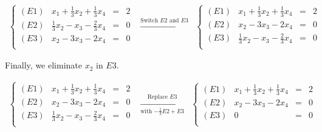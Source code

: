 \documentclass{ximera}
\begin{document}
\begin{example}
\begin{enumerate}
\[\begin{array}{ccc}

\left\{ 

\begin{array}{lrcr}

(E1) & x_1 + \frac{1}{3}x_2 + \frac{1}{3}x_4 & = & 2 \\   
(E2) &        \frac{1}{3} x_2 -x_3 -\frac{2}{3}x_4 & = & 0  \\  
(E3) &  x_2 -3x_3 -2x_4 & = & 0 \\

\end{array} 

\right.

&
\xrightarrow{\text{Switch $E2$ and $E3$}}

&
\left\{ 

\begin{array}{lrcr}

(E1) & x_1 + \frac{1}{3}x_2 + \frac{1}{3}x_4 & = & 2 \\   
(E2) &    x_2 -3x_3 -2x_4 & = & 0 \\  
(E3) &  \frac{1}{3} x_2 -x_3 -\frac{2}{3}x_4 & = & 0  \\

\end{array} 

\right.\end{array}\]

Finally, we eliminate $x_2$ in $E3$.

\[\begin{array}{ccc}
\left\{ 

\begin{array}{lrcr}

(E1) & x_1 + \frac{1}{3}x_2 + \frac{1}{3}x_4 & = & 2 \\   
(E2) &    x_2 -3x_3 -2x_4 & = & 0 \\  
(E3) &  \frac{1}{3} x_2 -x_3 -\frac{2}{3}x_4 & = & 0  \\

\end{array} 

\right.

&

\xrightarrow[\text{with $-\frac{1}{3}E2 + E3$}]{\text{Replace $E3$} }

&

\left\{ 

\begin{array}{lrcr}

(E1) & x_1 + \frac{1}{3}x_2 + \frac{1}{3}x_4 & = & 2 \\   
(E2) &    x_2 -3x_3 -2x_4 & = & 0 \\     
(E3) & 0 & = & 0  \\


\end{array}
\end{array}\]
\end{enumerate}
\end{example}
\end{document}
